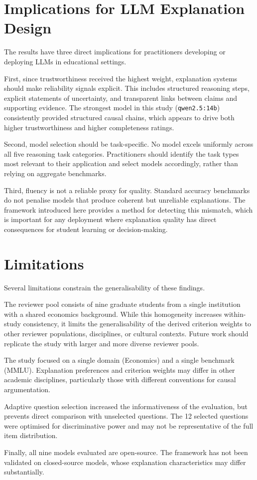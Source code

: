 \section{Implications for LLM Explanation Design}
\label{sec:disc-design}

The results have three direct implications for practitioners developing or deploying
LLMs in educational settings.

First, since trustworthiness received the highest weight, explanation systems should
make reliability signals explicit. This includes structured reasoning steps, explicit
statements of uncertainty, and transparent links between claims and supporting
evidence. The strongest model in this study (\texttt{qwen2.5:14b}) consistently
provided structured causal chains, which appears to drive both higher trustworthiness
and higher completeness ratings.

Second, model selection should be task-specific. No model excels uniformly across
all five reasoning task categories. Practitioners should identify the task types most
relevant to their application and select models accordingly, rather than relying on
aggregate benchmarks.

Third, fluency is not a reliable proxy for quality. Standard accuracy benchmarks do
not penalise models that produce coherent but unreliable explanations. The framework
introduced here provides a method for detecting this mismatch, which is important for
any deployment where explanation quality has direct consequences for student learning
or decision-making.

\section{Limitations}
\label{sec:disc-limitations}

Several limitations constrain the generalisability of these findings.

The reviewer pool consists of nine graduate students from a single institution with
a shared economics background. While this homogeneity increases within-study
consistency, it limits the generalisability of the derived criterion weights to other
reviewer populations, disciplines, or cultural contexts. Future work should replicate
the study with larger and more diverse reviewer pools.

The study focused on a single domain (Economics) and a single benchmark (MMLU).
Explanation preferences and criterion weights may differ in other academic disciplines,
particularly those with different conventions for causal argumentation.

Adaptive question selection increased the informativeness of the evaluation, but
prevents direct comparison with unselected questions. The 12 selected questions were
optimised for discriminative power and may not be representative of the full item
distribution.

Finally, all nine models evaluated are open-source. The framework has not been
validated on closed-source models, whose explanation characteristics may differ
substantially.

